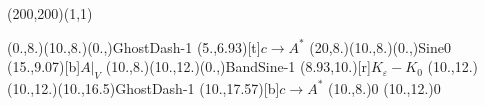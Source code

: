 \unitlength=1bp%

\begin{feynartspicture}(200,200)(1,1)

\FADiagram{}
\FAProp(0.,8.)(10.,8.)(0.,){GhostDash}{-1}
\FALabel(5.,6.93)[t]{$c\to A^*$}
\FAProp(20,8.)(10.,8.)(0.,){Sine}{0}
\FALabel(15.,9.07)[b]{$A|_V$}
\FAProp(10.,8.)(10.,12.)(0.,){BandSine}{-1}
\FALabel(8.93,10.)[r]{$K_\varepsilon-K_0$}
\FAProp(10.,12.)(10.,12.)(10.,16.5){GhostDash}{-1}
\FALabel(10.,17.57)[b]{$c\to A^*$}
\FAVert(10.,8.){0}
\FAVert(10.,12.){0}
\end{feynartspicture}

